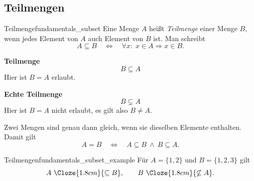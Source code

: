 \subsection{Teilmengen}
\label{subsec:fundamentals_subsets}

\begin{DefinitionBox}{Teilmenge}{fundamentals_subset}
  Eine Menge $A$ heißt \emph{Teilmenge}  einer Menge $B$,
  wenn jedes Element von $A$ auch Element von $B$ ist. Man schreibt
  \[
    A\subseteq B
    \quad\Longleftrightarrow\quad
    \forall x:\; x\in A\Rightarrow x\in B.
  \]
\end{DefinitionBox}

\begin{RemarkBox}[title=\Lang{Bemerkung}{Remark}]
  \begin{minipage}[t]{0.46\linewidth}
    \textbf{Teilmenge}
    \[
      B\subseteq A
    \]
    Hier ist $B=A$ erlaubt.
  \end{minipage}
  \hfill
  \begin{minipage}[t]{0.46\linewidth}
    \textbf{Echte Teilmenge}
    \[
      B\subsetneq A
    \]
    Hier ist $B=A$ nicht erlaubt, es gilt also $B\neq A$.
  \end{minipage}
\end{RemarkBox}

Zwei Mengen sind genau dann gleich, wenn sie dieselben Elemente enthalten.
Damit gilt
\[
  A=B
  \quad\Longleftrightarrow\quad
  A\subseteq B\ \land\ B\subseteq A.
\]

\begin{ExampleBox}{Teilmengen}{fundamentals_subset_example}
  Für $A=\{1,2\}$ und $B=\{1,2,3\}$ gilt
  \[
    A\ \Cloze{1.8cm}{\subseteq B},
    \qquad
    B\ \Cloze{1.8cm}{\not\subseteq A}.
  \]
\end{ExampleBox}
